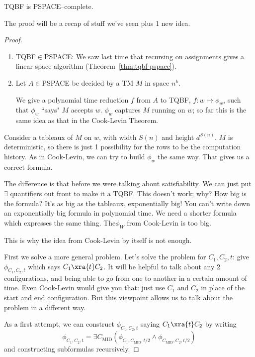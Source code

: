 \begin{thm}
TQBF is PSPACE--complete.
\end{thm}
The proof will be a recap of stuff we've seen plus 1 new idea.
\begin{proof}
\begin{enumerate}
\item
TQBF$\in$PSPACE: We saw last time that recursing on assignments gives a linear space algorithm (Theorem~\ref{thm:tqbf-pspace}).
\item
Let $A\in$PSPACE be decided by a TM $M$ in space $n^k$.

We give a polynomial time reduction $f$ from $A$ to TQBF,  $f:w\mapsto \phi_w$, such that $\phi_w$ ``says" $M$ accepts $w$. $\phi_w$ captures $M$ running on $w$; so far this is the same idea as that in the Cook-Levin Theorem.
\end{enumerate}

Consider a tableaux of $M$ on $w$, with width $S(n)$ and height $d^{S(n)}$. $M$ is deterministic, so there is just 1 possibility for the rows to be the computation history. %
As in Cook-Levin, we can try to build $\phi_w$ the same way. %
That gives us a correct formula.

The difference is that before we were talking about satisfiability. We can just put $\exists$ quantifiers out front to make it a TQBF.
This doesn't work; why? How big is the formula? It's as big as the tableaux, exponentially big! You can't write down an exponentially big formula in polynomial time. We need a shorter formula which expresses the same thing. The$\phi_W$ from Cook-Levin is too big.

This is why the idea from Cook-Levin by itself is not enough.

First we solve a more general problem. Let's solve the problem for $C_1,C_2,t$: give $\phi_{C_1,C_2,t}$ which says $C_1\xra{t} C_2$. It will be helpful to talk about any 2 configurations, and being able to go from one to another in a certain amount of time. Even Cook-Levin would give you that: just use $C_1$ and $C_2$ in place  of the start and end configuration. But this viewpoint allows us to talk about the problem in a different way. 

As a first attempt, we can construct $\phi_{C_1,C_2,t}$ saying $C_1\xra{t}C_2$ by writing 
\[
\phi_{C_1,C_2,t}=\exists C_{\text{MID}}(\phi_{C_1,C_{\text{MID}},t/2}\wedge \phi_{C_{\text{MID}},C_2,t/2})
\]
and constructing subformulas recursively.


\end{proof}
